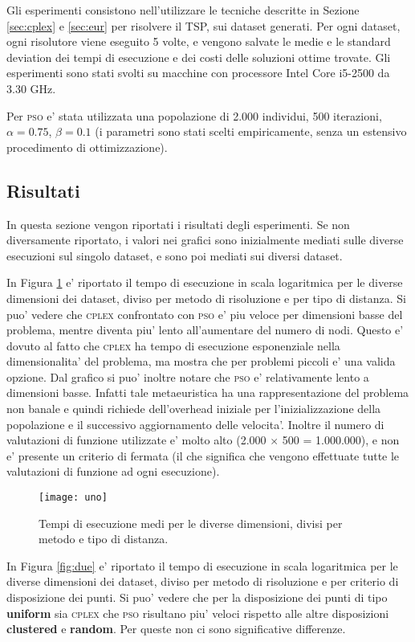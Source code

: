 \documentclass[
12pt, %
a4paper, %
oneside, %
headinclude,footinclude, %
BCOR5mm, %
]{scrartcl}
\begin{document}
Gli esperimenti consistono nell'utilizzare le tecniche descritte in Sezione \ref{sec:cplex} e \ref{sec:eur} per risolvere il TSP, sui dataset generati. Per ogni dataset, ogni risolutore viene eseguito 5 volte, e vengono salvate le medie e le standard deviation dei tempi di esecuzione e dei costi delle soluzioni ottime trovate. Gli esperimenti sono stati svolti su macchine con processore Intel Core i5-2500 da 3.30 GHz. 

Per \textsc{pso} e' stata utilizzata una popolazione di 2.000 individui, 500 iterazioni, $\alpha = 0.75$, $\beta=0.1$ (i parametri sono stati scelti empiricamente, senza un estensivo procedimento di ottimizzazione).

\subsection{Risultati}
In questa sezione vengon riportati i risultati degli esperimenti. Se non diversamente riportato, i valori nei grafici sono inizialmente mediati sulle diverse esecuzioni sul singolo dataset, e sono poi mediati sui diversi dataset.

In Figura \ref{fig:uno} e' riportato il tempo di esecuzione in scala logaritmica per le diverse dimensioni dei dataset, diviso per metodo di risoluzione e per tipo di distanza. Si puo' vedere che \textsc{cplex} confrontato con \textsc{pso} e' piu veloce per dimensioni basse del problema, mentre diventa piu' lento all'aumentare del numero di nodi. Questo e' dovuto al fatto che \textsc{cplex} ha tempo di esecuzione esponenziale nella dimensionalita' del problema, ma mostra che per problemi piccoli e' una valida opzione. Dal grafico si puo' inoltre notare che \textsc{pso} e' relativamente lento a dimensioni basse. Infatti tale metaeuristica ha una rappresentazione del problema non banale e quindi richiede dell'overhead iniziale per l'inizializzazione della popolazione e il successivo aggiornamento delle velocita'. Inoltre il numero di valutazioni di funzione utilizzate e' molto alto (2.000 $\times$ 500 = 1.000.000), e non e' presente un criterio di fermata (il che significa che vengono effettuate tutte le valutazioni di funzione ad ogni esecuzione).
\begin{figure}[htpb]
	\centering
	\texttt{[image: uno]}
	\caption[]{Tempi di esecuzione medi per le diverse dimensioni, divisi per metodo e tipo di distanza.}
	\label{fig:uno}
\end{figure}

In Figura \ref{fig:due} e' riportato il tempo di esecuzione in scala logaritmica per le diverse dimensioni dei dataset, diviso per metodo di risoluzione e per criterio di disposizione dei punti. Si puo' vedere che per la disposizione dei punti di tipo \textbf{uniform} sia \textsc{cplex} che \textsc{pso} risultano piu' veloci rispetto alle altre disposizioni \textbf{clustered} e \textbf{random}. Per queste non ci sono significative differenze.
\end{document}
